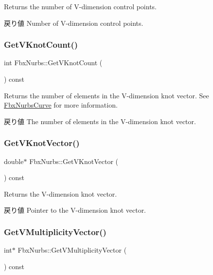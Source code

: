 Returns the number of V-\/dimension control points. \begin{DoxyReturn}{戻り値}
Number of V-\/dimension control points. 
\end{DoxyReturn}
\mbox{\label{class_fbx_nurbs_afd3187f4ef9e1e02b41f14bdb1a4bcbc}} 
\subsubsection{\texorpdfstring{Get\+V\+Knot\+Count()}{GetVKnotCount()}}
{\footnotesize\ttfamily int Fbx\+Nurbs\+::\+Get\+V\+Knot\+Count (\begin{DoxyParamCaption}{ }\end{DoxyParamCaption}) const}

Returns the number of elements in the V-\/dimension knot vector. See \hyperlink{class_fbx_nurbs_curve}{Fbx\+Nurbs\+Curve} for more information. \begin{DoxyReturn}{戻り値}
The number of elements in the V-\/dimension knot vector. 
\end{DoxyReturn}
\mbox{\label{class_fbx_nurbs_ab47ef5f3ec84fa392c38c1d0d3b2ca77}} 
\subsubsection{\texorpdfstring{Get\+V\+Knot\+Vector()}{GetVKnotVector()}}
{\footnotesize\ttfamily double$\ast$ Fbx\+Nurbs\+::\+Get\+V\+Knot\+Vector (\begin{DoxyParamCaption}{ }\end{DoxyParamCaption}) const}

Returns the V-\/dimension knot vector. \begin{DoxyReturn}{戻り値}
Pointer to the V-\/dimension knot vector. 
\end{DoxyReturn}
\mbox{\label{class_fbx_nurbs_a02bdc93c80499e43de757d4772270dac}} 
\subsubsection{\texorpdfstring{Get\+V\+Multiplicity\+Vector()}{GetVMultiplicityVector()}}
{\footnotesize\ttfamily int$\ast$ Fbx\+Nurbs\+::\+Get\+V\+Multiplicity\+Vector (\begin{DoxyParamCaption}{ }\end{DoxyParamCaption}) const}

